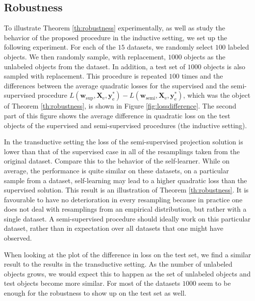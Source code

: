 \documentclass{article}
\newcommand{\Xe}{\vec{X}_\mathrm{e}  }
\renewcommand{\vec}[1]{\mathbf{#1}}
\begin{document}
\subsection{Robustness}
To illustrate Theorem \ref{th:robustness} experimentally, as well as study the behavior of the proposed procedure in the inductive setting, we set up the following experiment. For each of the $15$ datasets, we randomly select $100$ labeled objects. We then randomly sample, with replacement, $1000$ objects as the unlabeled objects from the dataset. In addition, a test set of $1000$ objects is also sampled with replacement. This procedure is repeated $100$ times and the differences between the average quadratic losses for the supervised and the semi-supervised procedure $L(\vec{w}_\text{sup},\Xe,\vec{y}_\text{e}^{\ast}) - L(\vec{w}_\text{semi},\Xe,\vec{y}_\text{e}^{\ast})$, which was the object of Theorem \ref{th:robustness}, is shown in Figure \ref{fig:lossdifference}. The second part of this figure shows the average difference in quadratic loss on the test objects of the supervised and semi-supervised procedures (the inductive setting).

In the transductive setting the loss of the semi-supervised projection solution is lower than that of the supervised case in all of the resamplings taken from the original dataset. Compare this to the behavior of the self-learner. While on average, the performance is quite similar on these datasets, on a particular sample from a dataset, self-learning may lead to a higher quadratic loss than the supervised solution. This result is an illustration of Theorem \ref{th:robustness}. It is favourable to have no deterioration in every resampling because in practice one does not deal with resamplings from an empirical distribution, but rather with a single dataset. A semi-supervised procedure should ideally work on this particular dataset, rather than in expectation over all datasets that one might have observed. %

When looking at the plot of the difference in loss on the test set, we find a similar result to the results in the transductive setting. As the number of unlabeled objects grows, we would expect this to happen as the set of unlabeled objects and test objects become more similar. For most of the datasets $1000$ seem to be enough for the robustness to show up on the test set as well.
\end{document}
